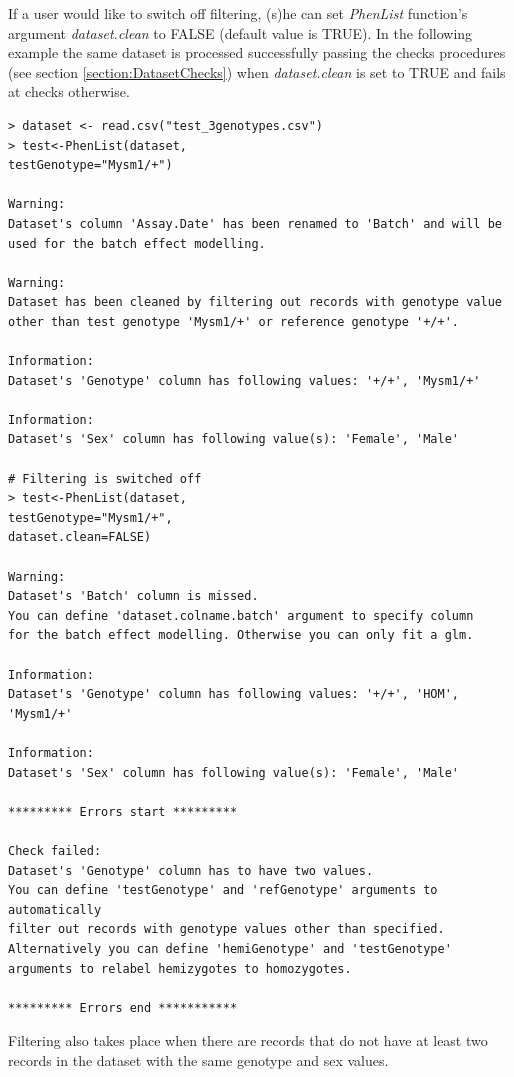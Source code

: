 \documentclass[12pt,a4paper]{article}
\begin{document}
If a user would like to switch off filtering, (s)he can set \textit{PhenList} function's argument \textit{dataset.clean} to FALSE (default value is TRUE). 
In the following example the same dataset is processed successfully passing the checks procedures (see section \ref{section:DatasetChecks}) when \textit{dataset.clean} is set to TRUE and fails at checks otherwise.

\begingroup
    \fontsize{8pt}{12pt}\selectfont
\begin{verbatim}
> dataset <- read.csv("test_3genotypes.csv")
> test<-PhenList(dataset,
testGenotype="Mysm1/+")

Warning:
Dataset's column 'Assay.Date' has been renamed to 'Batch' and will be used for the batch effect modelling.

Warning:
Dataset has been cleaned by filtering out records with genotype value 
other than test genotype 'Mysm1/+' or reference genotype '+/+'.

Information:
Dataset's 'Genotype' column has following values: '+/+', 'Mysm1/+'

Information:
Dataset's 'Sex' column has following value(s): 'Female', 'Male'

# Filtering is switched off
> test<-PhenList(dataset,
testGenotype="Mysm1/+",
dataset.clean=FALSE)

Warning:
Dataset's 'Batch' column is missed.
You can define 'dataset.colname.batch' argument to specify column 
for the batch effect modelling. Otherwise you can only fit a glm.

Information:
Dataset's 'Genotype' column has following values: '+/+', 'HOM', 'Mysm1/+'

Information:
Dataset's 'Sex' column has following value(s): 'Female', 'Male'

********* Errors start *********

Check failed:
Dataset's 'Genotype' column has to have two values.
You can define 'testGenotype' and 'refGenotype' arguments to automatically 
filter out records with genotype values other than specified. 
Alternatively you can define 'hemiGenotype' and 'testGenotype' arguments to relabel hemizygotes to homozygotes.

********* Errors end ***********
\end{verbatim}
\endgroup

Filtering also takes place when there are records that do not have at least two records in the dataset with the same genotype and sex values. 
\end{document}
